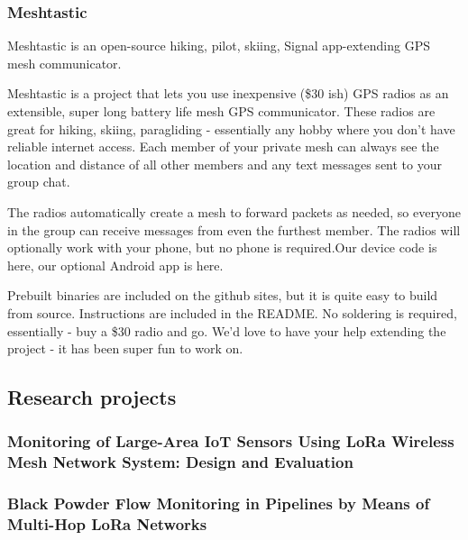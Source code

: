 				\subsubsection{Meshtastic}\label{subsubsec:meshtastic}
	
						
					Meshtastic is an open-source hiking, pilot, skiing, Signal app-extending GPS mesh communicator.
					
					Meshtastic is a project that lets you use inexpensive (\$30 ish) GPS radios as an extensible, super long battery life mesh GPS communicator. These radios are great for hiking, skiing, paragliding - essentially any hobby where you don’t have reliable internet access. Each member of your private mesh can always see the location and distance of all other members and any text messages sent to your group chat.
					
					The radios automatically create a mesh to forward packets as needed, so everyone in the group can receive messages from even the furthest member. The radios will optionally work with your phone, but no phone is required.Our device code is here, our optional Android app is here.
					
					Prebuilt binaries are included on the github sites, but it is quite easy to build from source. Instructions are included in the README. No soldering is required, essentially - buy a \$30 radio and go. We'd love to have your help extending the project - it has been super fun to work on.
		
		\subsection{Research projects}
		
			\subsubsection{Monitoring of Large-Area IoT Sensors Using LoRa Wireless Mesh Network System: Design and Evaluation}
			
			\subsubsection{Black Powder Flow Monitoring in Pipelines by Means of Multi-Hop LoRa Networks}
		
